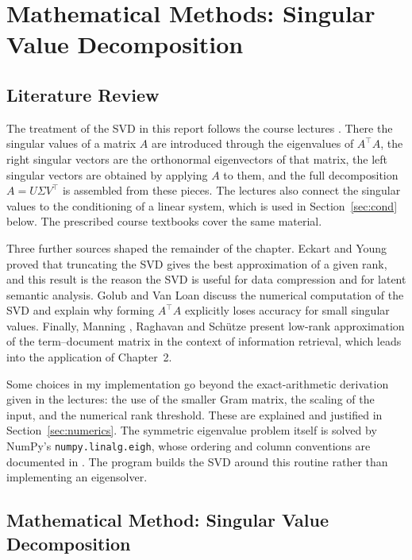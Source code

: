 \documentclass[12pt,a4paper]{report}
\newcommand{\T}{^{\top}}
\theoremstyle{plain}
\theoremstyle{definition}
\theoremstyle{remark}
\theoremstyle{definition}
\begin{document}
\clearpage
\tableofcontents
\clearpage
{}

\chapter{Mathematical Methods: Singular Value Decomposition}

\section{Literature Review}

The treatment of the SVD in this report follows the course lectures \cite{lectures}. There the singular values of a matrix $A$ are introduced through the eigenvalues of $A\T A$, the right singular vectors are the orthonormal eigenvectors of that matrix, the left singular vectors are obtained by applying $A$ to them, and the full decomposition $A=U\Sigma V\T$ is assembled from these pieces. The lectures also connect the singular values to the conditioning of a linear system, which is used in Section~\ref{sec:cond} below. The prescribed course textbooks \cite{lay,strang} cover the same material.

Three further sources shaped the remainder of the chapter. Eckart and Young \cite{eckartyoung} proved that truncating the SVD gives the best approximation of a given rank, and this result is the reason the SVD is useful for data compression and for latent semantic analysis. Golub and Van Loan \cite{golubvanloan} discuss the numerical computation of the SVD and explain why forming $A\T A$ explicitly loses accuracy for small singular values. Finally, Manning \cite{Manning}, Raghavan and Sch\"utze   present low-rank approximation of the term--document matrix in the context of information retrieval, which leads into the application of Chapter~2.

Some choices in my implementation go beyond the exact-arithmetic derivation given in the lectures: the use of the smaller Gram matrix, the scaling of the input, and the numerical rank threshold. These are explained and justified in Section~\ref{sec:numerics}. The symmetric eigenvalue problem itself is solved by NumPy's \texttt{numpy.linalg.eigh}, whose ordering and column conventions are documented in \cite{numpyeigh}. The program builds the SVD around this routine rather than implementing an eigensolver.

\section{Mathematical Method: Singular Value Decomposition}
\end{document}
